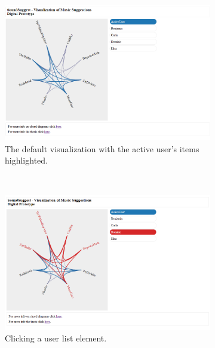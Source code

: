 \documentclass[a4paper,10pt,twocolumn]{article}
\begin{document}
\begin{appendices}
	\begin{figure}
		\centering
		\begin{subfigure}[t]{0.3\textwidth} %
						\centering
						\includegraphics[width=\textwidth]{img/prototype_soundsuggest1_default}
						\caption{The default visualization with the active user's items highlighted.}
						\label{figure:prototype_soundsuggest1_default}
		\end{subfigure}%
		~
		\begin{subfigure}[t]{0.3\textwidth}
						\centering
						\includegraphics[width=\textwidth]{img/prototype_soundsuggest1_user_click}
						\caption{Clicking a user list element.}
						\label{figure:prototype_soundsuggest1_user_click}
		\end{subfigure}
		~
		\begin{subfigure}[t]{0.3\textwidth}
						\centering

\end{subfigure}
\end{figure}
\end{appendices}
\end{document}
